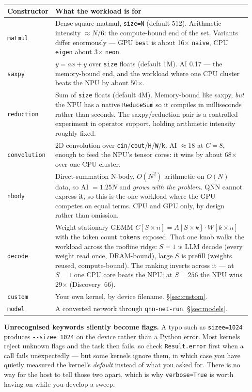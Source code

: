 \documentclass[11pt,a4paper]{article}
\newcommand{\code}[1]{\texttt{\let\_\breakableunderscore #1}}
\newcommand{\breakableunderscore}{\textunderscore\allowbreak}
\begin{document}
\begin{longtable}{@{}p{2.3cm}p{12.5cm}@{}}
\toprule
\textbf{Constructor} & \textbf{What the workload is for} \\
\midrule
\endhead
\code{matmul} & Dense square matmul, \code{size=N} (default 512). Arithmetic
  intensity $\approx N/6$: the compute-bound end of the set. Variants differ
  enormously --- GPU \code{best} is about 16$\times$ \code{naive}, CPU
  \code{eigen} about 3$\times$ \code{neon}. \\
\code{saxpy} & $y = ax + y$ over \code{size} floats (default 1M). AI 0.17 ---
  the memory-bound end, and the workload where one CPU cluster beats the NPU by
  about 50$\times$. \\
\code{reduction} & Sum of \code{size} floats (default 4M). Memory-bound like
  saxpy, \emph{but} the NPU has a native \code{ReduceSum} so it compiles in
  milliseconds rather than seconds. The saxpy/reduction pair is a controlled
  experiment in operator support, holding arithmetic intensity roughly fixed. \\
\code{convolution} & 2D convolution over \code{cin}/\code{cout}/\code{H}/\code{W}/\code{k}.
  AI $\approx 18$ at $C=8$, enough to feed the NPU's tensor cores: it wins by
  about 68$\times$ over one CPU cluster. \\
\code{nbody} & Direct-summation N-body, $O(N^2)$ arithmetic on $O(N)$ data, so
  AI $= 1.25N$ and \emph{grows with the problem}. QNN cannot express it, so
  this is the one workload where the GPU competes on equal terms. CPU and GPU
  only, by design rather than omission. \\
\code{decode} & Weight-stationary GEMM $C[S \times n] = A[S \times k] \cdot
  W[k \times n]$ with the token count \code{tokens} exposed. That one knob
  walks the workload across the roofline ridge: $S=1$ is LLM decode (every
  weight read once, DRAM-bound), large $S$ is prefill (weights reused,
  compute-bound). The ranking inverts across it --- at $S=1$ one CPU core beats
  the NPU; at $S=256$ the NPU wins 29$\times$ (Discovery~66). \\
\code{custom} & Your own kernel, by device filename. \S\ref{sec:custom}. \\
\code{model} & A converted network through \code{qnn-net-run}.
  \S\ref{sec:models}. \\
\bottomrule
\end{longtable}

\noindent \textbf{Unrecognised keywords silently become flags.} A typo such as
\code{sizee=1024} produces \code{-{}-sizee 1024} on the device rather than a
Python error. Most kernels reject unknown flags and the task then fails, so
check \code{Result.error} first when a call fails unexpectedly --- but some
kernels ignore them, in which case you have quietly measured the kernel's
\emph{default} instead of what you asked for. There is no way for the host to
tell those two apart, which is why \code{verbose=True} is worth having on while
you develop a sweep.
\end{document}
